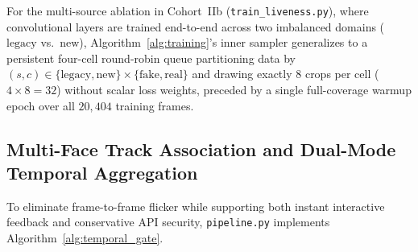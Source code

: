 For the multi-source ablation in Cohort~IIb (\texttt{train\_liveness.py}), where convolutional layers are trained end-to-end across two imbalanced domains ($\text{legacy}$ vs.\ $\text{new}$), Algorithm~\ref{alg:training}'s inner sampler generalizes to a persistent four-cell round-robin queue partitioning data by $(s, c) \in \{\text{legacy}, \text{new}\} \times \{\text{fake}, \text{real}\}$ and drawing exactly $8$ crops per cell ($4 \times 8 = 32$) without scalar loss weights, preceded by a single full-coverage warmup epoch over all $20{,}404$ training frames.

\subsection{Multi-Face Track Association and Dual-Mode Temporal Aggregation}

To eliminate frame-to-frame flicker while supporting both instant interactive feedback and conservative API security, \texttt{pipeline.py} implements Algorithm~\ref{alg:temporal_gate}.

